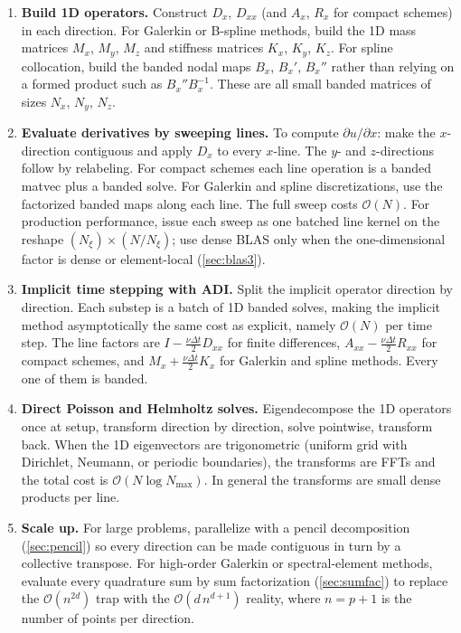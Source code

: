 \documentclass[11pt]{article}
\newcommand{\Dx}{D_{x}}
\newcommand{\Dxx}{D_{xx}}
\newcommand{\Ax}{A_{x}}
\newcommand{\Axx}{A_{xx}}
\newcommand{\Rx}{R_{x}}
\newcommand{\Rxx}{R_{xx}}
\newcommand{\dt}{\Delta t}
\newcommand{\bigO}{\mathcal{O}}
\newcommand{\Nall}{N}
\begin{document}
\begin{enumerate}
  \item \textbf{Build 1D operators.}
    Construct $\Dx$, $\Dxx$ (and $\Ax$, $\Rx$ for compact schemes)
    in each direction.  For Galerkin or B-spline methods, build the 1D
    mass matrices $M_x$, $M_y$, $M_z$ and stiffness matrices $K_x$,
    $K_y$, $K_z$.  For spline collocation, build the banded nodal maps
    $B_x$, $B_x'$, $B_x''$ rather than relying on a formed product such
    as $B_x'' B_x^{-1}$.  These are all small banded matrices of sizes
    $N_x$, $N_y$, $N_z$.

  \item \textbf{Evaluate derivatives by sweeping lines.}
    To compute $\partial u/\partial x$: make the $x$-direction
    contiguous and apply $\Dx$ to every $x$-line.  The $y$- and
    $z$-directions follow by relabeling.  For compact schemes each
    line operation is a banded matvec plus a banded solve.  For
    Galerkin and spline discretizations, use the factorized banded
    maps along each line.  The full sweep costs $\bigO(\Nall)$.  For
    production performance, issue each sweep as one batched line kernel
    on the reshape $(N_\xi) \times (\Nall / N_\xi)$; use dense
    BLAS only when the one-dimensional factor is dense or element-local
    (\cref{sec:blas3}).

  \item \textbf{Implicit time stepping with ADI.}
    Split the implicit operator direction by direction.  Each substep
    is a batch of 1D banded solves, making the implicit method
    asymptotically the same cost as explicit, namely $\bigO(\Nall)$
    per time step.  The line factors are $I - \tfrac{\nu\dt}{2}\Dxx$
    for finite differences, $\Axx - \tfrac{\nu\dt}{2}\Rxx$ for
    compact schemes, and $M_x + \tfrac{\nu\dt}{2}K_x$ for Galerkin
    and spline methods.  Every one of them is banded.

  \item \textbf{Direct Poisson and Helmholtz solves.}
    Eigendecompose the 1D operators once at setup, transform
    direction by direction, solve pointwise, transform back.  When
    the 1D eigenvectors are trigonometric (uniform grid with
    Dirichlet, Neumann, or periodic boundaries), the transforms are
    FFTs and the total cost is $\bigO(\Nall \log N_{\max})$.  In
    general the transforms are small dense products per line.

  \item \textbf{Scale up.}
    For large problems, parallelize with a pencil decomposition
    (\cref{sec:pencil}) so every direction can be made contiguous in
    turn by a collective transpose.  For high-order Galerkin or
    spectral-element methods, evaluate every quadrature sum by sum
    factorization (\cref{sec:sumfac}) to replace the
    $\bigO(n^{2d})$ trap with the $\bigO(d\,n^{d+1})$ reality, where
    $n=p+1$ is the number of points per direction.
\end{enumerate}
\end{document}
